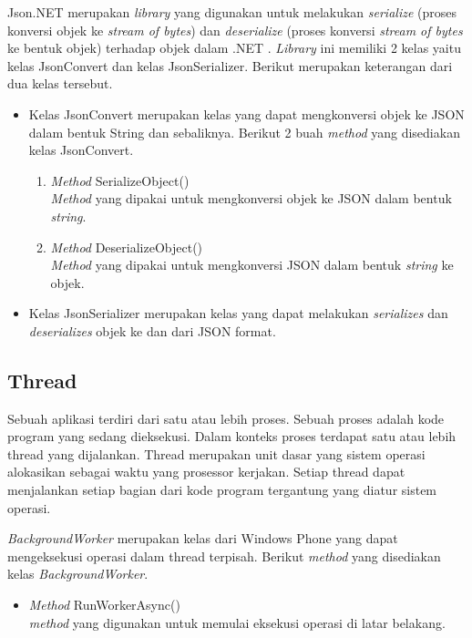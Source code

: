 \hspace{0.5cm} Json.NET merupakan \textit{library} yang digunakan untuk melakukan \textit{serialize} (proses konversi objek ke \textit{stream of bytes}) dan \textit{deserialize} (proses konversi \textit{stream of bytes} ke bentuk objek) terhadap objek dalam .NET \cite{jsonNet}. \textit{Library} ini memiliki 2 kelas yaitu kelas JsonConvert dan kelas JsonSerializer. Berikut merupakan keterangan dari dua kelas tersebut.
\begin{itemize}
	\item Kelas JsonConvert merupakan kelas yang dapat mengkonversi objek ke JSON dalam bentuk String dan sebaliknya. Berikut 2 buah \textit{method} yang disediakan kelas JsonConvert. 
		\begin{enumerate}
			\item \textit{Method} SerializeObject() \\
			\textit{Method} yang dipakai untuk mengkonversi objek ke JSON dalam bentuk \textit{string}.
			\item \textit{Method} DeserializeObject()\\
			\textit{Method} yang dipakai untuk mengkonversi JSON dalam bentuk \textit{string} ke objek.
		\end{enumerate}
	\item Kelas JsonSerializer merupakan kelas yang dapat melakukan \textit{serializes} dan \textit{deserializes} objek ke dan dari JSON format.
\end{itemize}

\subsection{Thread}
\label{subsec:Thread}
\hspace{0.5cm} Sebuah aplikasi terdiri dari satu atau lebih proses. Sebuah proses adalah kode program yang sedang dieksekusi. Dalam konteks proses terdapat satu atau lebih thread yang dijalankan. Thread merupakan unit dasar yang sistem operasi alokasikan sebagai waktu yang prosessor kerjakan. Setiap thread dapat menjalankan setiap bagian dari kode program tergantung yang diatur sistem operasi. 

\hspace{0.5cm} \textit{BackgroundWorker} merupakan kelas dari Windows Phone yang dapat mengeksekusi operasi dalam thread terpisah. Berikut \textit{method} yang disediakan kelas \textit{BackgroundWorker}.
\begin{itemize}
	\item \textit{Method} RunWorkerAsync() \\
	\textit{method} yang digunakan untuk memulai eksekusi operasi di latar belakang.
\end{itemize}

